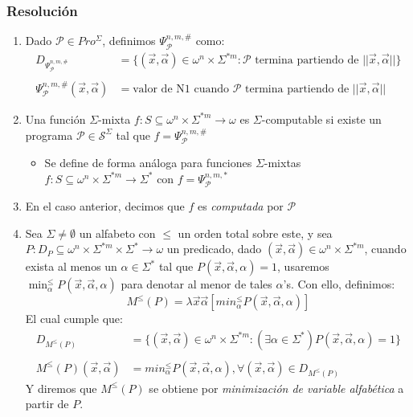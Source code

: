 \documentclass[
]{article}
\providecommand{\tightlist}{%
  \setlength{\itemsep}{0pt}\setlength{\parskip}{0pt}}
\begin{document}
\subsubsection{Resolución}\label{resoluciuxf3n-10}

\begin{enumerate}
\def\labelenumi{\arabic{enumi}.}
\tightlist
\item
  Dado \(\mathcal{P}\in Pro^\Sigma\), definimos
  \(\Psi_\mathcal{P}^{n,m,\#}\) como:
  \[\begin{aligned}D_{\Psi_\mathcal{P}^{n,m,\#}} &= \{(\vec{x}, \vec{\alpha})\in\omega^n\times\Sigma^{*m}:\mathcal{P}\text{ termina partiendo de }||\vec{x}, \vec{\alpha}||\}\\ \\ \Psi_\mathcal{P}^{n,m,\#}(\vec{x}, \vec{\alpha}) &= \text{valor de N1 cuando }\mathcal{P}\text{ termina partiendo de }||\vec{x}, \vec{\alpha}||\end{aligned}\]
\item
  Una función \(\Sigma\)-mixta
  \(f:S\subseteq\omega^n\times\Sigma^{*m}\to\omega\) es
  \(\Sigma\)-computable si existe un programa
  \(\mathcal{P}\in \mathcal{S}^\Sigma\) tal que
  \(f=\Psi_\mathcal{P}^{n,m,\#}\)

  \begin{itemize}
  \tightlist
  \item
    Se define de forma análoga para funciones \(\Sigma\)-mixtas
    \(f:S\subseteq\omega^n\times\Sigma^{*m}\to\Sigma^*\) con
    \(f=\Psi_\mathcal{P}^{n,m,*}\)
  \end{itemize}
\item
  En el caso anterior, decimos que \(f\) es \emph{computada} por
  \(\mathcal{P}\)
\item
  Sea \(\Sigma\neq\emptyset\) un alfabeto con \(\leq\) un orden total
  sobre este, y sea
  \(P:D_P\subseteq\omega^n\times\Sigma^{*m}\times\Sigma^*\to\omega\) un
  predicado, dado
  \((\vec{x},\vec{\alpha})\in\omega^n\times\Sigma^{*m}\), cuando exista
  al menos un \(\alpha\in\Sigma^*\) tal que
  \(P(\vec{x},\vec{\alpha},\alpha)=1\), usaremos
  \(\min_\alpha^\leq P(\vec{x},\vec{\alpha},\alpha)\) para denotar al
  menor de tales \(\alpha\)'s. Con ello, definimos:
  \[M^\leq(P)=\lambda\vec{x}\vec{\alpha}[min_\alpha^\leq P(\vec{x},\vec{\alpha},\alpha)]\]
  El cual cumple que:
  \[\begin{aligned} D_{M^\leq(P)}&=\{(\vec{x},\vec{\alpha})\in\omega^n\times\Sigma^{*m}:(\exists\alpha\in\Sigma^*) P(\vec{x},\vec{\alpha},\alpha)=1\}\\ \\ M^\leq(P)(\vec{x},\vec{\alpha})&=min_\alpha^\leq P(\vec{x},\vec{\alpha},\alpha), \forall(\vec{x},\vec{\alpha})\in D_{M^\leq(P)}\end{aligned}\]
  Y diremos que \(M^\leq(P)\) se obtiene por \emph{minimización de
  variable alfabética} a partir de \(P\).
\end{enumerate}
\end{document}
